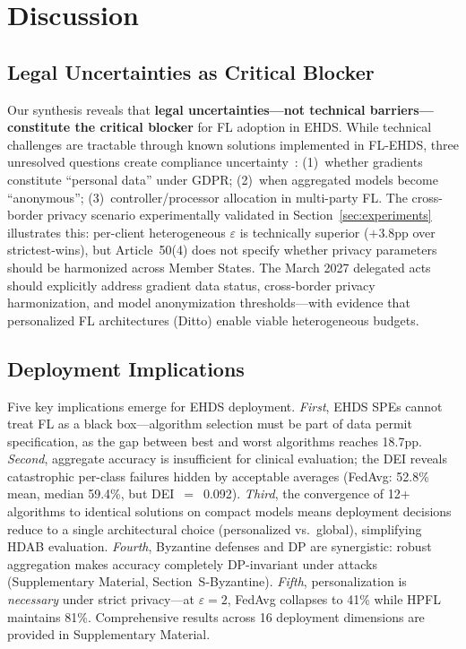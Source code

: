 \documentclass[conference]{IEEEtran}
\begin{document}
\section{Discussion}
\label{sec:discussion}

\subsection{Legal Uncertainties as Critical Blocker}

Our synthesis reveals that \textbf{legal uncertainties---not technical barriers---constitute the critical blocker} for FL adoption in EHDS. While technical challenges are tractable through known solutions implemented in FL-EHDS, three unresolved questions create compliance uncertainty~\cite{quinn2024gdpr}: (1)~whether gradients constitute ``personal data'' under GDPR; (2)~when aggregated models become ``anonymous''; (3)~controller/processor allocation in multi-party FL. The cross-border privacy scenario experimentally validated in Section~\ref{sec:experiments} illustrates this: per-client heterogeneous $\varepsilon$ is technically superior ($+$3.8pp over strictest-wins), but Article~50(4) does not specify whether privacy parameters should be harmonized across Member States. The March 2027 delegated acts should explicitly address gradient data status, cross-border privacy harmonization, and model anonymization thresholds---with evidence that personalized FL architectures (Ditto) enable viable heterogeneous budgets.

\subsection{Deployment Implications}

Five key implications emerge for EHDS deployment. \textit{First}, EHDS SPEs cannot treat FL as a black box---algorithm selection must be part of data permit specification, as the gap between best and worst algorithms reaches 18.7pp. \textit{Second}, aggregate accuracy is insufficient for clinical evaluation; the DEI reveals catastrophic per-class failures hidden by acceptable averages (FedAvg: 52.8\% mean, median 59.4\%, but DEI~$=$~0.092). \textit{Third}, the convergence of 12+ algorithms to identical solutions on compact models means deployment decisions reduce to a single architectural choice (personalized vs.\ global), simplifying HDAB evaluation. \textit{Fourth}, Byzantine defenses and DP are synergistic: robust aggregation makes accuracy completely DP-invariant under attacks (Supplementary Material, Section~S-Byzantine). \textit{Fifth}, personalization is \textit{necessary} under strict privacy---at $\varepsilon{=}2$, FedAvg collapses to 41\% while HPFL maintains 81\%. Comprehensive results across 16 deployment dimensions are provided in Supplementary Material.
\end{document}
